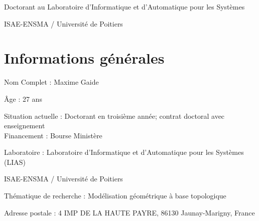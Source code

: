 \documentclass[11pt,a4paper,oneside]{article}
\begin{document}
\begin{titlepage}

	\vspace*{5.5cm}

	\begin{center}




		\vspace{2.5cm}


		\vspace{1.5cm}


	\end{center}

	\vfill

	\noindent Doctorant au Laboratoire d'Informatique et d'Automatique pour les Systèmes

	\noindent ISAE-ENSMA / Université de Poitiers

\end{titlepage}

\clearpage

\shipout\null

\clearpage

\section{Informations générales}

\noindent Nom Complet : Maxime Gaide

\noindent Âge : 27 ans

\noindent Situation actuelle : Doctorant en troisième année; contrat doctoral avec enseignement \\
\noindent Financement : Bourse Ministère

\noindent Laboratoire : \tabto{2.35cm}Laboratoire d'Informatique et d'Automatique pour les Systèmes (LIAS)

\noindent \tabto{2.35cm}  ISAE-ENSMA / Université de Poitiers

\noindent Thématique de recherche : Modélisation géométrique à base topologique

\noindent Adresse postale : 4 IMP DE LA HAUTE PAYRE, 86130 Jaunay-Marigny, France
\end{document}
